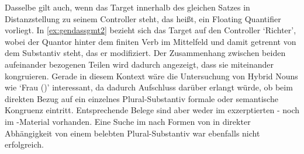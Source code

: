 Dasselbe gilt auch, wenn das Target innerhalb des gleichen Satzes in
Distanzstellung zu seinem Controller steht, das heißt, ein Floating Quantifier
vorliegt. In \cref{ex:gendassgmt2} bezieht sich das Target  auf den
Controller  `Richter', wobei der Quantor hinter dem finiten
Verb im Mittelfeld und damit getrennt von dem Substantiv steht, das er
modifiziert. Der Zusammenhang zwischen beiden aufeinander bezogenen Teilen wird
dadurch angezeigt, dass sie miteinander kongruieren. Gerade in diesem Kontext
wäre die Untersuchung von Hybrid Nouns wie  `Frau (\NeutF)'
interessant, da dadurch Aufschluss darüber erlangt würde, ob beim direkten
Bezug auf ein einzelnes Plural-Substantiv formale oder semantische Kongruenz
eintritt. Entsprechende Belege sind aber weder im exzerptierten
\CAO{}- noch im \KC{}-Material vorhanden. Eine Suche im
\REM{} nach Formen von  in direkter Abhängigkeit von einem
belebten Plural-Substantiv war ebenfalls nicht erfolgreich.%
%
